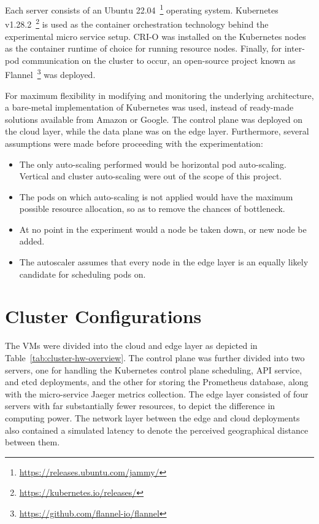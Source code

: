 Each server consists of an Ubuntu 22.04~\footnote{\url{https://releases.ubuntu.com/jammy/}} operating system. Kubernetes v1.28.2~\footnote{\url{https://kubernetes.io/releases/}} is used as the container orchestration technology behind the experimental micro service setup. CRI-O was installed on the Kubernetes nodes as the container runtime of choice for running resource nodes. Finally, for inter-pod communication on the cluster to occur, an open-source project known as Flannel~\footnote{\url{https://github.com/flannel-io/flannel}} was deployed.\par

For maximum flexibility in modifying and monitoring the underlying architecture, a bare-metal implementation of Kubernetes was used, instead of ready-made solutions available from Amazon or Google. The control plane was deployed on the cloud layer, while the data plane was on the edge layer. Furthermore, several assumptions were made before proceeding with the experimentation:

\begin{itemize}
    \item The only auto-scaling performed would be horizontal pod auto-scaling. Vertical and cluster auto-scaling were out of the scope of this project.
    \item The pods on which auto-scaling is not applied would have the maximum possible resource allocation, so as to remove the chances of bottleneck.
    \item At no point in the experiment would a node be taken down, or new node be added.
    \item The autoscaler assumes that every node in the edge layer is an equally likely candidate for scheduling pods on.
\end{itemize}

\section{Cluster Configurations}
\label{sec:ch6-cluster-config}

The VMs were divided into the cloud and edge layer as depicted in Table~\ref{tab:cluster-hw-overview}. The control plane was further divided into two servers, one for handling the Kubernetes control plane scheduling, API service, and etcd deployments, and the other for storing the Prometheus database, along with the micro-service Jaeger metrics collection. The edge layer consisted of four servers with far substantially fewer resources, to depict the difference in computing power. The network layer between the edge and cloud deployments also contained a simulated latency to denote the perceived geographical distance between them.\par

